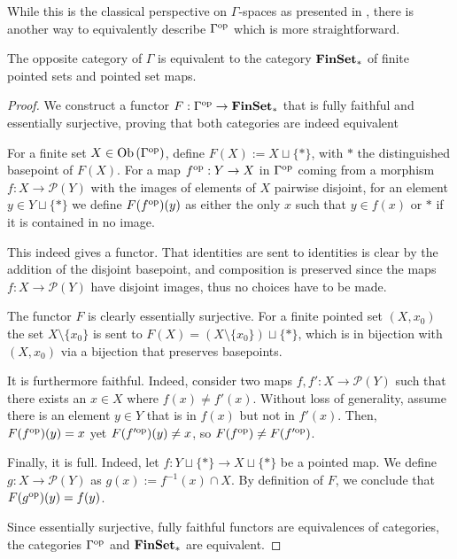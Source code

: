 While this is the classical perspective on $\Gamma$-spaces as presented in \cite{segal_categories_1974}, there is another way to equivalently describe $\Gamma^{\textnormal{op}}$ which is more straightforward.

\begin{proposition}
    The opposite category of $\Gamma$ is equivalent to the category $\textbf{FinSet}_*$ of finite pointed sets and pointed set maps.
\end{proposition}
\begin{proof}
    We construct a functor $F : \Gamma^{\textnormal{op}} \to \textbf{FinSet}_*$ that is fully faithful and essentially surjective, proving that both categories are indeed equivalent

    For a finite set $X \in \operatorname{Ob}{\lparen \Gamma^{\textnormal{op}} \rparen}$, define $F(X) := X \sqcup \{*\}$, with $*$ the distinguished basepoint of $F(X)$. For a map $f^{\textnormal{op}} : Y \to X$ in $\Gamma^{\textnormal{op}}$ coming from a morphism $f : X \to \mathcal{P} (Y)$ with the images of elements of $X$ pairwise disjoint, for an element $y \in Y \sqcup \{*\}$ we define $F(f^{\textnormal{op}})(y)$ as either the only $x$ such that $y \in f(x)$ or $*$ if it is contained in no image.

    This indeed gives a functor. That identities are sent to identities is clear by the addition of the disjoint basepoint, and composition is preserved since the maps $f : X \to \mathcal{P} (Y)$ have disjoint images, thus no choices have to be made.

    The functor $F$ is clearly essentially surjective. For a finite pointed set $(X, x_0)$ the set $X \setminus \{x_0\}$ is sent to $F(X) = (X \setminus \{x_0\}) \sqcup \{*\}$, which is in bijection with $(X, x_0)$ via a bijection that preserves basepoints.

    It is furthermore faithful. Indeed, consider two maps $f, f' : X \to \mathcal{P} (Y)$ such that there exists an $x \in X$ where $f(x) \neq f'(x)$. Without loss of generality, assume there is an element $y \in Y$ that is in $f(x)$ but not in $f'(x)$. Then, $F(f^{\textnormal{op}})(y) = x$ yet $F(f'^{\textnormal{op}})(y) \neq x$, so $F(f^{\textnormal{op}}) \neq F(f'^{\textnormal{op}})$.

    Finally, it is full. Indeed, let $f : Y \sqcup \{*\} \to X \sqcup\{*\}$ be a pointed map. We define $g : X \to \mathcal{P}(Y)$ as $g(x) := f^{-1}(x) \cap X$. By definition of $F$, we conclude that $F(g^{\textnormal{op}})(y) = f(y)$.

    Since essentially surjective, fully faithful functors are equivalences of categories, the categories $\Gamma^{\textnormal{op}}$ and $\textbf{FinSet}_*$ are equivalent.
\end{proof}

